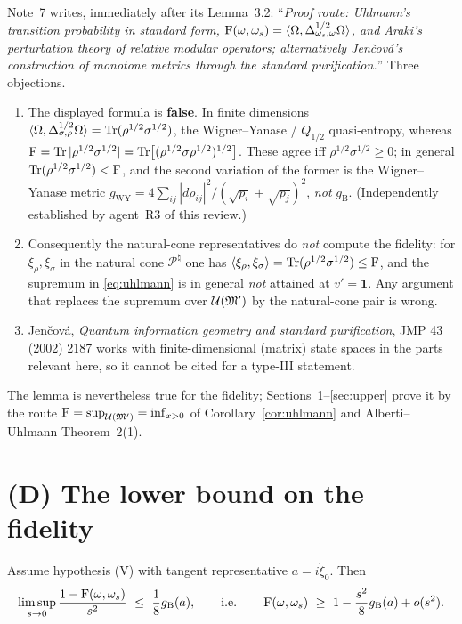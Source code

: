 \documentclass[11pt]{article}
\newcommand{\Om}{\Omega}
\newcommand{\gB}{g_{\mathrm B}}
\newcommand{\ip}[2]{\langle #1,#2\rangle}
\newcommand{\U}{\mathcal U}
\newcommand{\one}{\mathbf 1}
\begin{document}
\begin{issue}\label{iss:wrong-uhlmann}
Note~7 writes, immediately after its Lemma~3.2: ``\emph{Proof route: Uhlmann's transition probability in standard
form, $\Fid(\omega,\omega_s)=\langle\Om,\Delta_{\omega_s,\omega}^{1/2}\Om\rangle$, and Araki's perturbation theory of
relative modular operators; alternatively Jen\v cov\'a's construction of monotone metrics through the standard
purification.}''  Three objections.
\begin{enumerate}[leftmargin=1.7em]
\item The displayed formula is \textbf{false}.  In finite dimensions
$\ip{\Om}{\Delta_{\sigma,\rho}^{1/2}\Om}=\Tr(\rho^{1/2}\sigma^{1/2})$, the Wigner--Yanase / $Q_{1/2}$ quasi-entropy,
whereas $\operatorname{F}=\operatorname{Tr}|\rho^{1/2}\sigma^{1/2}|=\operatorname{Tr}\bigl[(\rho^{1/2}\sigma\rho^{1/2})^{1/2}\bigr]$.  These agree iff
$\rho^{1/2}\sigma^{1/2}\ge0$; in general $\operatorname{Tr}(\rho^{1/2}\sigma^{1/2})<\operatorname{F}$, and the second variation of the former is
the Wigner--Yanase metric $g_{\mathrm{WY}}=4\sum_{ij}|d\rho_{ij}|^2/(\sqrt{p_i}+\sqrt{p_j})^2$, \emph{not} $\gB$.
(Independently established by agent~R3 of this review.)
\item Consequently the natural-cone representatives do \emph{not} compute the fidelity: for $\xi_\rho,\xi_\sigma$
in the natural cone $\mathcal P^\natural$ one has $\ip{\xi_\rho}{\xi_\sigma}=\Tr(\rho^{1/2}\sigma^{1/2})\le\Fid$, and
the supremum in \eqref{eq:uhlmann} is in general \emph{not} attained at $v'=\one$.  Any argument that replaces the
supremum over $\U(\cM')$ by the natural-cone pair is wrong.
\item Jen\v cov\'a, \emph{Quantum information geometry and standard purification}, JMP 43 (2002) 2187 works with
finite-dimensional (matrix) state spaces in the parts relevant here, so it cannot be cited for a type-III statement.
\end{enumerate}
The lemma is nevertheless true for the fidelity; Sections~\ref{sec:lower}--\ref{sec:upper} prove it by the route
$\Fid=\sup_{\U(\cM')}=\inf_{x>0}$ of Corollary~\ref{cor:uhlmann} and Alberti--Uhlmann Theorem~2(1).
\end{issue}

\section{(D) The lower bound on the fidelity}\label{sec:lower}

\begin{theorem}\label{thm:lower}
Assume hypothesis \textup{(V)} with tangent representative $a=i\dot\xi_0$.  Then
\begin{equation}\label{eq:lower}
 \limsup_{s\to0}\frac{1-\Fid(\omega,\omega_s)}{s^2}\ \le\ \frac18\gB(a),
 \qquad\text{i.e.}\qquad \Fid(\omega,\omega_s)\ \ge\ 1-\frac{s^2}{8}\gB(a)+o(s^2).
\end{equation}
\end{theorem}
\end{document}
